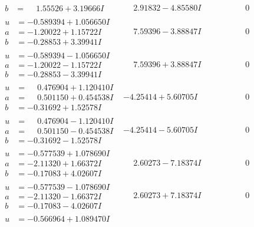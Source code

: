 \documentclass[1p]{elsarticle_modified}
\theoremstyle{definition}
\begin{document}
$$\begin{array}{c|c|c}
\begin{aligned}
b &= \phantom{-}1.55526 + 3.19666 I\end{aligned}
 & \phantom{-}2.91832 - 4.85580 I & \phantom{-0.000000 } 0 \\ \hline\begin{aligned}
u &= -0.589394 + 1.056650 I \\
a &= -1.20022 + 1.15722 I \\
b &= -0.28853 + 3.39941 I\end{aligned}
 & \phantom{-}7.59396 - 3.88847 I & \phantom{-0.000000 } 0 \\ \hline\begin{aligned}
u &= -0.589394 - 1.056650 I \\
a &= -1.20022 - 1.15722 I \\
b &= -0.28853 - 3.39941 I\end{aligned}
 & \phantom{-}7.59396 + 3.88847 I & \phantom{-0.000000 } 0 \\ \hline\begin{aligned}
u &= \phantom{-}0.476904 + 1.120410 I \\
a &= \phantom{-}0.501150 + 0.454538 I \\
b &= -0.31692 + 1.52578 I\end{aligned}
 & -4.25414 + 5.60705 I & \phantom{-0.000000 } 0 \\ \hline\begin{aligned}
u &= \phantom{-}0.476904 - 1.120410 I \\
a &= \phantom{-}0.501150 - 0.454538 I \\
b &= -0.31692 - 1.52578 I\end{aligned}
 & -4.25414 - 5.60705 I & \phantom{-0.000000 } 0 \\ \hline\begin{aligned}
u &= -0.577539 + 1.078690 I \\
a &= -2.11320 + 1.66372 I \\
b &= -0.17083 + 4.02607 I\end{aligned}
 & \phantom{-}2.60273 - 7.18374 I & \phantom{-0.000000 } 0 \\ \hline\begin{aligned}
u &= -0.577539 - 1.078690 I \\
a &= -2.11320 - 1.66372 I \\
b &= -0.17083 - 4.02607 I\end{aligned}
 & \phantom{-}2.60273 + 7.18374 I & \phantom{-0.000000 } 0 \\ \hline\begin{aligned}
u &= -0.566964 + 1.089470 I \\

\end{aligned}
\end{array}$$
\end{document}
